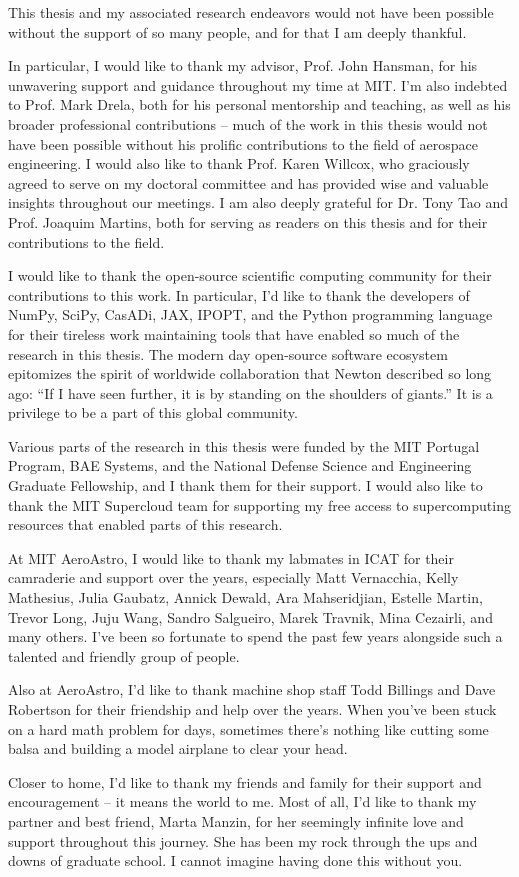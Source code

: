 This thesis and my associated research endeavors would not have been possible without the support of so many people, and for that I am deeply thankful.

In particular, I would like to thank my advisor, Prof. John Hansman, for his unwavering support and guidance throughout my time at MIT. I'm also indebted to Prof. Mark Drela, both for his personal mentorship and teaching, as well as his broader professional contributions -- much of the work in this thesis would not have been possible without his prolific contributions to the field of aerospace engineering. I would also like to thank Prof. Karen Willcox, who graciously agreed to serve on my doctoral committee and has provided wise and valuable insights throughout our meetings. I am also deeply grateful for Dr. Tony Tao and Prof. Joaquim Martins, both for serving as readers on this thesis and for their contributions to the field.

I would like to thank the open-source scientific computing community for their contributions to this work. In particular, I'd like to thank the developers of NumPy, SciPy, CasADi, JAX, IPOPT, and the Python programming language for their tireless work maintaining tools that have enabled so much of the research in this thesis. The modern day open-source software ecosystem epitomizes the spirit of worldwide collaboration that Newton described so long ago: ``If I have seen further, it is by standing on the shoulders of giants.'' It is a privilege to be a part of this global community.

Various parts of the research in this thesis were funded by the MIT Portugal Program, BAE Systems, and the National Defense Science and Engineering Graduate Fellowship, and I thank them for their support. I would also like to thank the MIT Supercloud team for supporting my free access to supercomputing resources that enabled parts of this research.

At MIT AeroAstro, I would like to thank my labmates in ICAT for their camraderie and support over the years, especially Matt Vernacchia, Kelly Mathesius, Julia Gaubatz, Annick Dewald, Ara Mahseridjian, Estelle Martin, Trevor Long, Juju Wang, Sandro Salgueiro, Marek Travnik, Mina Cezairli, and many others. I've been so fortunate to spend the past few years alongside such a talented and friendly group of people.

Also at AeroAstro, I'd like to thank machine shop staff Todd Billings and Dave Robertson for their friendship and help over the years. When you've been stuck on a hard math problem for days, sometimes there's nothing like cutting some balsa and building a model airplane to clear your head.


Closer to home, I'd like to thank my friends and family for their support and encouragement -- it means the world to me. Most of all, I'd like to thank my partner and best friend, Marta Manzin, for her seemingly infinite love and support throughout this journey. She has been my rock through the ups and downs of graduate school. I cannot imagine having done this without you.
